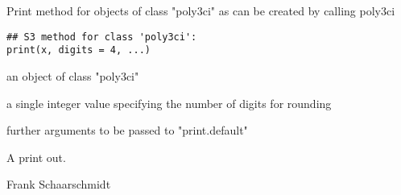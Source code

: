 \begin{Description}\relax
Print method for objects of class "poly3ci" as can be created by calling poly3ci
\end{Description}
\begin{Usage}
\begin{verbatim}
## S3 method for class 'poly3ci':
print(x, digits = 4, ...)
\end{verbatim}
\end{Usage}
\begin{Arguments}
\begin{ldescription}
\item[\code{x}] an object of class "poly3ci" 
\item[\code{digits}] a single integer value specifying the number of digits for rounding 
\item[\code{...}] further arguments to be passed to "print.default" 
\end{ldescription}
\end{Arguments}
\begin{Value}
A print out.
\end{Value}
\begin{Author}\relax
Frank Schaarschmidt
\end{Author}

